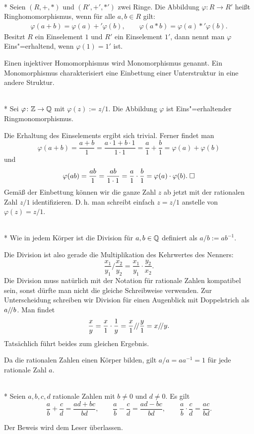 \newpage
\begin{Definition}[Ringhomomorphismus]\mbox{}\\*
Seien $(R,+,*)$ und $(R',+',*')$ zwei Ringe. Die Abbildung
$\varphi\colon R\to R'$ heißt Ringhomomorphismus, wenn für alle
$a,b\in R$ gilt:
\begin{align*}
\varphi(a+b) = \varphi(a)+'\varphi(b),\qquad
\varphi(a*b) = \varphi(a)*'\varphi(b).
\end{align*}
Besitzt $R$ ein Einselement $1$ und $R'$ ein Einselement $1'$,
dann nennt man $\varphi$ Eins"=erhaltend, wenn $\varphi(1)=1'$ ist.
\end{Definition}
Einen injektiver Homomorphismus wird Monomorphismus genannt. Ein
Monomorphismus charakterisiert eine Einbettung einer Unterstruktur
in eine andere Struktur.
\begin{Satz}\mbox{}\\*
Sei $\varphi\colon\mathbb Z\to\mathbb Q$ mit $\varphi(z):=z/1$. Die
Abbildung $\varphi$ ist Eins"=erhaltender Ringmonomorphismus.
\end{Satz}
 Die Erhaltung des Einselements ergibt sich
trivial. Ferner findet man
\[\varphi(a+b) = \frac{a+b}{1} = \frac{a\cdot 1+b\cdot 1}{1\cdot 1}
= \frac{a}{1}+\frac{b}{1} = \varphi(a)+\varphi(b)\]
und
\[\varphi(ab) = \frac{ab}{1} = \frac{ab}{1\cdot 1} = \frac{a}{1}\cdot\frac{b}{1}
= \varphi(a)\cdot\varphi(b).\;\Box\]
Gemäß der Einbettung können wir die ganze Zahl $z$ ab jetzt
mit der rationalen Zahl $z/1$ identifizieren. D.\,h. man schreibt
einfach $z=z/1$ anstelle von $\varphi(z)=z/1$.

\begin{Definition}\mbox{}\\*
Wie in jedem Körper ist die Division für $a,b\in\mathbb Q$
definiert als $a/b := ab^{-1}$.
\end{Definition}
Die Division ist also gerade die Multiplikation des Kehrwertes
des Nenners:
\[\frac{x_1}{y_1}/\frac{x_2}{y_2} = \frac{x_1}{y_1}\cdot\frac{y_2}{x_2}.\]
Die Division muss natürlich mit der Notation für rationale Zahlen
kompatibel sein, sonst dürfte man nicht die gleiche Schreibweise
verwenden. Zur Unterscheidung schreiben wir Division für einen
Augenblick mit Doppelstrich als $a/\!/ b$. Man findet
\[\frac{x}{y} = \frac{x}{1}\cdot\frac{1}{y}
= \frac{x}{1}/\!/\frac{y}{1} = x/\!/ y.\]
Tatsächlich führt beides zum gleichen Ergebnis.

Da die rationalen Zahlen einen Körper bilden, gilt $a/a=aa^{-1}=1$
für jede rationale Zahl $a$.

\begin{Satz}\mbox{}\\*
Seien $a,b,c,d$ rationale Zahlen mit $b\ne 0$ und $d\ne 0$. Es gilt
\[\frac{a}{b}+\frac{c}{d} = \frac{ad+bc}{bd},
\qquad \frac{a}{b}-\frac{c}{d} = \frac{ad-bc}{bd},
\qquad \frac{a}{b}\cdot\frac{c}{d} = \frac{ac}{bd}.\]
\end{Satz}
Der Beweis wird dem Leser überlassen.
